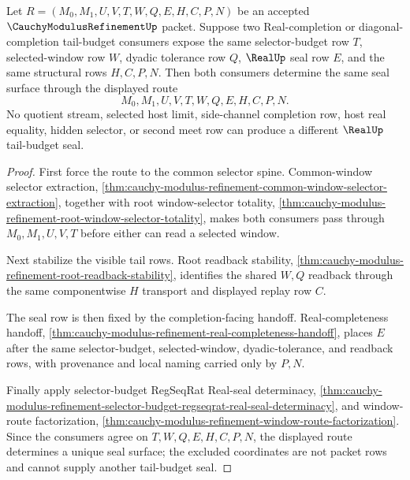 \begin{theorem}
\label{thm:cauchy-modulus-refinement-tail-budget-seal-uniqueness}
Let $R=(M_0,M_1,U,V,T,W,Q,E,H,C,P,N)$ be an accepted $\CauchyModulusRefinementUp$ packet. Suppose two Real-completion or diagonal-completion tail-budget consumers expose the same selector-budget row $T$, selected-window row $W$, dyadic tolerance row $Q$, $\RealUp$ seal row $E$, and the same structural rows $H,C,P,N$. Then both consumers determine the same seal surface through the displayed route
$$
M_0,M_1,U,V,T,W,Q,E,H,C,P,N.
$$
No quotient stream, selected host limit, side-channel completion row, host real equality, hidden selector, or second meet row can produce a different $\RealUp$ tail-budget seal.
\end{theorem}
\begin{proof}
First force the route to the common selector spine. Common-window selector extraction, \autoref{thm:cauchy-modulus-refinement-common-window-selector-extraction}, together with root window-selector totality, \autoref{thm:cauchy-modulus-refinement-root-window-selector-totality}, makes both consumers pass through $M_0,M_1,U,V,T$ before either can read a selected window.

Next stabilize the visible tail rows. Root readback stability, \autoref{thm:cauchy-modulus-refinement-root-readback-stability}, identifies the shared $W,Q$ readback through the same componentwise $H$ transport and displayed replay row $C$.

The seal row is then fixed by the completion-facing handoff. Real-completeness handoff, \autoref{thm:cauchy-modulus-refinement-real-completeness-handoff}, places $E$ after the same selector-budget, selected-window, dyadic-tolerance, and readback rows, with provenance and local naming carried only by $P,N$.

Finally apply selector-budget RegSeqRat Real-seal determinacy, \autoref{thm:cauchy-modulus-refinement-selector-budget-regseqrat-real-seal-determinacy}, and window-route factorization, \autoref{thm:cauchy-modulus-refinement-window-route-factorization}. Since the consumers agree on $T,W,Q,E,H,C,P,N$, the displayed route determines a unique seal surface; the excluded coordinates are not packet rows and cannot supply another tail-budget seal.
\end{proof}

